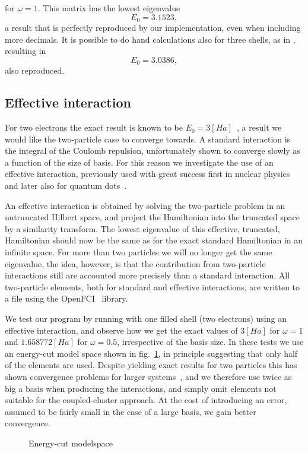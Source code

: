 for $\omega=1$.
This matrix has the lowest eigenvalue
\begin{equation}
E_0 = 3.1523,
\end{equation}
a result that is perfectly reproduced by our implementation, even when including more decimals. 
It is possible to do hand calculations also for three shells, as in \cite{marte}, resulting in 
\begin{equation}
E_0 = 3.0386,
\end{equation}
also reproduced.



\subsection{Effective interaction}
For two electrons the exact result is known to be $E_0 = 3[Ha]$~\cite{mtaut}, a result we would like the two-particle case to converge towards.
A standard interaction is the integral of the Coulomb repulsion, unfortunately shown to converge slowly as a function of the size of basis. 
For this reason we investigate the use of an effective interaction, previously used with great success first in nuclear physics and later also for quantum dots~\cite{PhysRevB.84.115302}.

An effective interaction is obtained by solving the two-particle problem in an untruncated Hilbert space, and project the Hamiltonian into the truncated space by a similarity transform.
The lowest eigenvalue of this effective, truncated, Hamiltonian should now be the same as for the exact standard Hamiltonian in an infinite space.
For more than two particles we will no longer get the same eigenvalue, the idea, however, is that the contribution from two-particle interactions still are accounted more precisely than a standard interaction.
All two-particle elements, both for standard and effective interactions, are written to a file using the OpenFCI~\cite{openfci} library.

We test our program by running with one filled shell (two electrons) using an effective interaction, and observe how we get the exact values of $3[Ha]$ for $\omega=1$ and $1.658772[Ha]$ for $\omega= 0.5$, irrespective of the basis size.
In these tests we use an energy-cut model space shown in fig.~\ref{fig:results:energycut}, in principle suggesting that only half of the elements are used.
Despite yielding exact results for two particles this has shown convergence problems for larger systems~\cite{mplohne}, and we therefore use twice as big a basis when producing the interactions, and simply omit elements not suitable for the coupled-cluster approach.
At the cost of introducing an error, assumed to be fairly small in the case of a large basis, we gain better convergence.
\begin{figure}
\begin{center}
\caption{Energy-cut modelspace}
\label{fig:results:energycut}
\end{center}
\end{figure}



